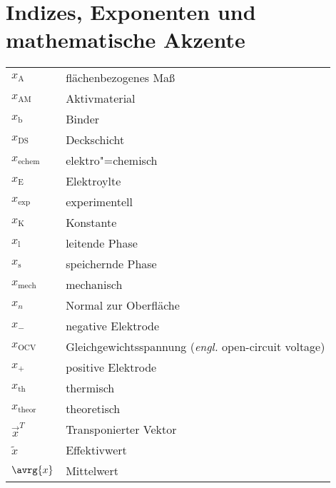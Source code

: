 {\section*{Indizes, Exponenten und mathematische Akzente}

\begin{longtable}{@{}p{\TabulatorVZ}@{}p{\TabulatorTX+\TabulatorEH+2\tabcolsep}@{}}
	$x_{\text{A}}$				& flächenbezogenes Maß\\
	$x_{\text{AM}}$				& Aktivmaterial\\
	$x_{\text{b}}$				& Binder\\
	$x_{\text{DS}}$				& Deckschicht\\
	$x_{\text{echem}}$			& elektro"=chemisch\\
	$x_{\text{E}}$				& Elektroylte\\
	$x_{\text{exp}}$			& experimentell\\
	$x_{\text{K}}$				& Konstante \\
	$x_{\text{l}}$				& leitende Phase\\
	$x_{\text{s}}$				& speichernde Phase\\
	$x_{\text{mech}}$			& mechanisch\\
	$x_n$						& Normal zur Oberfläche	\\
	$x_{-}$						& negative Elektrode \\
	$x_{\text{OCV}}$			& Gleichgewichtsspannung (\textit{engl.} open-circuit voltage) \\
	$x_{+}$						& positive Elektrode \\
	$x_{\text{th}}$				& thermisch \\
	$x_{\text{theor}}$			& theoretisch \\
	$\vec{x}^T$					& Transponierter Vektor	\\
	$\tilde{x}$				    & Effektivwert 	\\
	$\avrg{x}$					& Mittelwert
\end{longtable}

} %


\clearpage